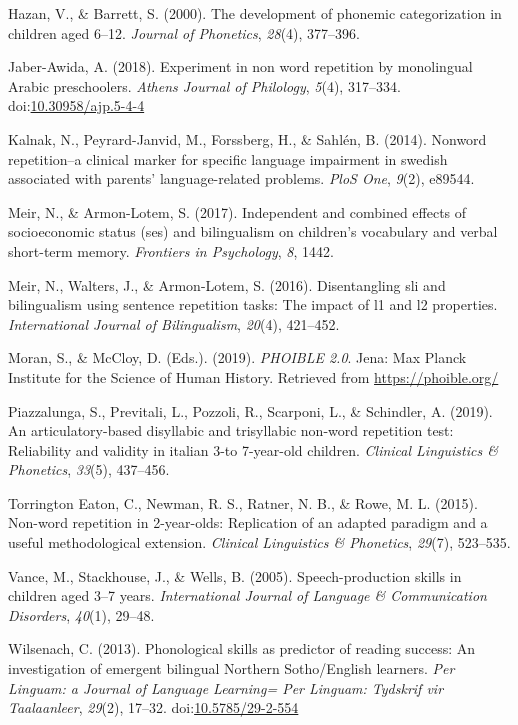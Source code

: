 \documentclass[english,,man,floatsintext]{apa6}
\begin{document}
\hypertarget{ref-hazan2000development}{}
Hazan, V., \& Barrett, S. (2000). The development of phonemic
categorization in children aged 6--12. \emph{Journal of Phonetics},
\emph{28}(4), 377--396.

\hypertarget{ref-jabere2018xperiment}{}
Jaber-Awida, A. (2018). Experiment in non word repetition by monolingual
Arabic preschoolers. \emph{Athens Journal of Philology}, \emph{5}(4),
317--334.
doi:\href{https://doi.org/10.30958/ajp.5-4-4}{10.30958/ajp.5-4-4}

\hypertarget{ref-kalnak2014nonword}{}
Kalnak, N., Peyrard-Janvid, M., Forssberg, H., \& Sahlén, B. (2014).
Nonword repetition--a clinical marker for specific language impairment
in swedish associated with parents' language-related problems.
\emph{PloS One}, \emph{9}(2), e89544.

\hypertarget{ref-meir2017independent}{}
Meir, N., \& Armon-Lotem, S. (2017). Independent and combined effects of
socioeconomic status (ses) and bilingualism on children's vocabulary and
verbal short-term memory. \emph{Frontiers in Psychology}, \emph{8},
1442.

\hypertarget{ref-meir2016disentangling}{}
Meir, N., Walters, J., \& Armon-Lotem, S. (2016). Disentangling sli and
bilingualism using sentence repetition tasks: The impact of l1 and l2
properties. \emph{International Journal of Bilingualism}, \emph{20}(4),
421--452.

\hypertarget{ref-phoible}{}
Moran, S., \& McCloy, D. (Eds.). (2019). \emph{PHOIBLE 2.0}. Jena: Max
Planck Institute for the Science of Human History. Retrieved from
\url{https://phoible.org/}

\hypertarget{ref-piazzalunga2019articulatory}{}
Piazzalunga, S., Previtali, L., Pozzoli, R., Scarponi, L., \& Schindler,
A. (2019). An articulatory-based disyllabic and trisyllabic non-word
repetition test: Reliability and validity in italian 3-to 7-year-old
children. \emph{Clinical Linguistics \& Phonetics}, \emph{33}(5),
437--456.

\hypertarget{ref-torrington2015non}{}
Torrington Eaton, C., Newman, R. S., Ratner, N. B., \& Rowe, M. L.
(2015). Non-word repetition in 2-year-olds: Replication of an adapted
paradigm and a useful methodological extension. \emph{Clinical
Linguistics \& Phonetics}, \emph{29}(7), 523--535.

\hypertarget{ref-vance2005speech}{}
Vance, M., Stackhouse, J., \& Wells, B. (2005). Speech-production skills
in children aged 3--7 years. \emph{International Journal of Language \&
Communication Disorders}, \emph{40}(1), 29--48.

\hypertarget{ref-wilsenach2013phonological}{}
Wilsenach, C. (2013). Phonological skills as predictor of reading
success: An investigation of emergent bilingual Northern Sotho/English
learners. \emph{Per Linguam: a Journal of Language Learning= Per
Linguam: Tydskrif vir Taalaanleer}, \emph{29}(2), 17--32.
doi:\href{https://doi.org/10.5785/29-2-554}{10.5785/29-2-554}
\end{document}
